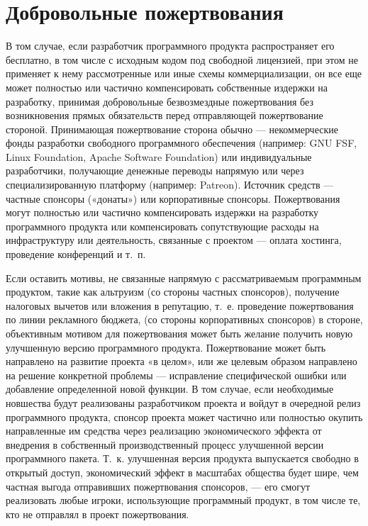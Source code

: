 \documentclass{article}
\begin{document}
\section*{Добровольные пожертвования}

В том случае, если разработчик программного продукта распространяет его бесплатно, в том числе с исходным кодом под свободной лицензией, при этом не применяет к нему рассмотренные или иные схемы коммерциализации, он все еще может полностью или частично компенсировать собственные издержки на разработку, принимая добровольные безвозмездные пожертвования без возникновения прямых обязательств перед отправляющей пожертвование стороной. Принимающая пожертвование сторона обычно — некоммерческие фонды разработки свободного программного обеспечения (например: GNU FSF, Linux Foundation, Apache Software Foundation) или индивидуальные разработчики, получающие денежные переводы напрямую или через специализированную платформу (например: Patreon). Источник средств — частные спонсоры («донаты») или корпоративные спонсоры. Пожертвования могут полностью или частично компенсировать издержки на разработку программного продукта или компенсировать сопутствующие расходы на инфраструктуру или деятельность, связанные с проектом — оплата хостинга, проведение конференций и т.~п.

Если оставить мотивы, не связанные напрямую с рассматриваемым программным продуктом, такие как альтруизм (со стороны частных спонсоров), получение налоговых вычетов или вложения в репутацию, т.~е. проведение пожертвования по линии рекламного бюджета, (со стороны корпоративных спонсоров) в стороне, объективным мотивом для пожертвования может быть желание получить новую улучшенную версию программного продукта. Пожертвование может быть направлено на развитие проекта «в целом», или же целевым образом направлено на решение конкретной проблемы — исправление специфической ошибки или добавление определенной новой функции. В том случае, если необходимые новшества будут реализованы разработчиком проекта и войдут в очередной релиз программного продукта, спонсор проекта может частично или полностью окупить направленные им средства через реализацию экономического эффекта от внедрения в собственный производственный процесс улучшенной версии программного пакета. Т.~к. улучшенная версия продукта выпускается свободно в открытый доступ, экономический эффект в масштабах общества будет шире, чем частная выгода отправивших пожертвования спонсоров, — его смогут реализовать любые игроки, использующие программный продукт, в том числе те, кто не отправлял в проект пожертвования.
\end{document}
